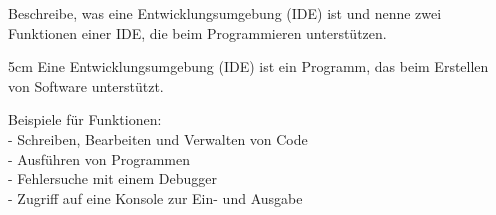 \question[3]
Beschreibe, was eine Entwicklungsumgebung (IDE) ist und nenne zwei Funktionen einer IDE,
 die beim Programmieren unterstützen.

\begin{solutionbox}{5cm}
Eine Entwicklungsumgebung (IDE) ist ein
Programm, das beim Erstellen von Software
unterstützt.

Beispiele für Funktionen: \\
- Schreiben, Bearbeiten und Verwalten von Code  \\
- Ausführen von Programmen \\
- Fehlersuche mit einem Debugger \\
- Zugriff auf eine Konsole zur Ein- und Ausgabe
\end{solutionbox}